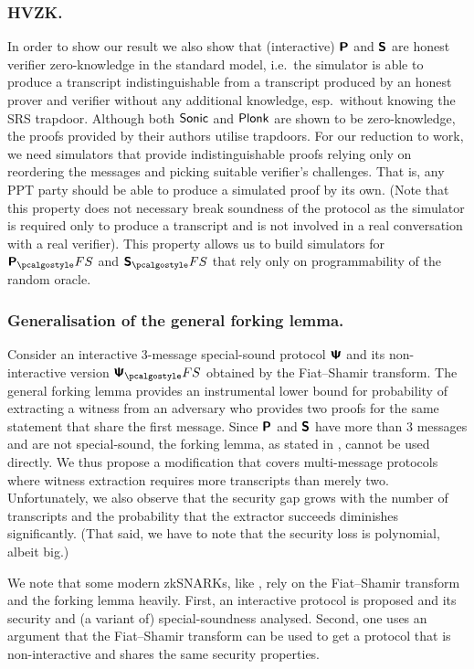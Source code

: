 \documentclass[runningheads,11pt]{llncs}
\theoremstyle{definition} \newtheorem{definition}[theorem]{Definition}
\begin{document}
\subsubsection{HVZK.}%
In order to show our result we also show that (interactive) $\bm{\mathsf{P}}$ and
$\bm{\mathsf{S}}$ are honest verifier zero-knowledge in the standard model, i.e.~the
simulator is able to produce a transcript indistinguishable from a transcript
produced by an honest prover and verifier without any additional knowledge,
esp.~without knowing the SRS trapdoor. Although both ${\textnormal{\textsf{Sonic}}}$ and $\textnormal{\textsf{Plonk}}$ are
shown to be zero-knowledge, the proofs provided by their authors utilise
trapdoors. For our reduction to work, we need simulators that provide
indistinguishable proofs relying only on reordering the messages
and picking suitable verifier's challenges. That is, any PPT party should be
able to produce a simulated proof by its own. (Note that this property does not
necessary break soundness of the protocol as the simulator is required only to
produce a transcript and is not involved in a real conversation with a real
verifier). This property allows us to build simulators for $\plonkprotfs$ and
$\sonicprotfs$ that rely only on programmability of the random oracle.

\subsubsection{Generalisation of the general forking lemma.}
Consider an interactive $3$-message special-sound protocol $\bm{\mathsf{\Psi}}$ and its
non-interactive version $\ps_\fs$ obtained by the Fiat--Shamir transform. The
general forking lemma provides an instrumental lower bound for probability of
extracting a witness from an adversary who provides two proofs for the same
statement that share the first message. Since $\bm{\mathsf{P}}$ and $\bm{\mathsf{S}}$ have
more than $3$ messages and are not special-sound, the forking lemma, as stated
in \cite{CCS:BelNev06}, cannot be used directly. We thus propose a modification
that covers multi-message protocols where witness extraction requires more
transcripts than merely two.  Unfortunately, we also observe that the security
gap grows with the number of transcripts and the probability that the extractor
succeeds diminishes significantly. (That said, we have to note that the security
loss is polynomial, albeit big.)

We note that some modern zkSNARKs, like \cite{SP:BBBPWM18,CCS:MBKM19}, rely on
the Fiat--Shamir transform and the forking lemma heavily. First, an interactive
protocol is proposed and its security and (a variant of) special-soundness analysed. Second,
one uses an argument that the Fiat--Shamir transform can be used to get a
protocol that is non-interactive and shares the same security properties.
\end{document}
